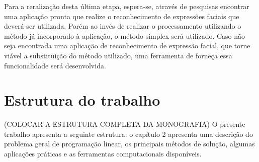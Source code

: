 Para a reralização desta última etapa, espera-se, através de pesquisas encontrar uma aplicação pronta que realize o reconhecimento de expressões faciais que deverá ser utilizada. Porém ao invés de realizar o processamento utilizando o método já incorporado à aplicação, o método simplex será utilizado. Caso não seja encontrada uma aplicação de reconhecimento de expressão facial, que torne viável a substituição do método utilizado, uma ferramenta de forneça essa funcionalidade será desenvolvida.

\section{Estrutura do trabalho} (COLOCAR A ESTRUTURA COMPLETA DA  MONOGRAFIA)
O presente trabalho apresenta a seguinte estrutura: o capítulo 2 apresenta uma descrição do problema geral de programação linear, os principais métodos de solução, algumas aplicações práticas e as ferramentas computacionais disponíveis. 
